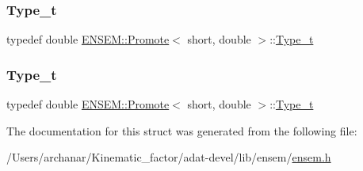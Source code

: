 \mbox{\label{structENSEM_1_1Promote_3_01short_00_01double_01_4_acad0693c601980c2646626dac6d30140}} 
\subsubsection{\texorpdfstring{Type\_t}{Type\_t}\hspace{0.1cm}{\footnotesize\ttfamily [2/3]}}
{\footnotesize\ttfamily typedef double \mbox{\hyperlink{structENSEM_1_1Promote}{E\+N\+S\+E\+M\+::\+Promote}}$<$ short, double $>$\+::\mbox{\hyperlink{structENSEM_1_1Promote_3_01short_00_01double_01_4_acad0693c601980c2646626dac6d30140}{Type\+\_\+t}}}

\mbox{\label{structENSEM_1_1Promote_3_01short_00_01double_01_4_acad0693c601980c2646626dac6d30140}} 
\subsubsection{\texorpdfstring{Type\_t}{Type\_t}\hspace{0.1cm}{\footnotesize\ttfamily [3/3]}}
{\footnotesize\ttfamily typedef double \mbox{\hyperlink{structENSEM_1_1Promote}{E\+N\+S\+E\+M\+::\+Promote}}$<$ short, double $>$\+::\mbox{\hyperlink{structENSEM_1_1Promote_3_01short_00_01double_01_4_acad0693c601980c2646626dac6d30140}{Type\+\_\+t}}}



The documentation for this struct was generated from the following file\+:\begin{DoxyCompactItemize}
\item 
/\+Users/archanar/\+Kinematic\+\_\+factor/adat-\/devel/lib/ensem/\mbox{\hyperlink{adat-devel_2lib_2ensem_2ensem_8h}{ensem.\+h}}\end{DoxyCompactItemize}
